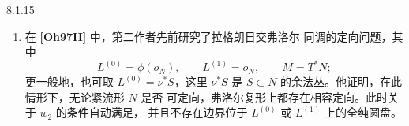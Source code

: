 \begin{remark}{8.1.15}
\begin{enumerate}[label=(\arabic*),leftmargin=2.8em]
容易看出，经
\[
 \mathcal I(p)\longrightarrow
 \mathcal P_p(TL^{(0)},TL^{(1)})
\]
拉回后，该丛在每个连通分支上仍不可定向，因为全实边界条件不依赖于
$\mathcal I_{\lambda_p}$ 中的元素。注意，
$\widetilde{\mathcal I}(p)\to\mathcal I(p)$ 是在
$\mathcal I(p)$ 每个连通分支上均非平凡的唯一双覆盖。因此，指标丛
进一步拉回后应当可定向，这就证明了断言。（也可以直接看出第二个
断言，因为 $\widetilde{\mathcal I}(p)$ 给出全实子丛上一族相容的
spin 结构。）

所以，“选取
$\operatorname{Index}(\bar\partial_{\lambda_{p^\pm},Z_-})$
的定向以及 $(\sigma^\pm,\iota_0^\pm,\iota_1^\pm)$”这一资料，
可以改述为：选取 $\widetilde{\mathcal I}(p)$ 上算子族
$\operatorname{Index}\bar\partial_{\cdot,Z_-}$ 的行列式线丛之定向。
后一解释更为典范，也可用于其他情形，例如博特--莫尔斯情形；
见命题 8.8.1。

\item 在 \textbf{[Oh97II]} 中，第二作者先前研究了拉格朗日交弗洛尔
同调的定向问题，其中
\[
 L^{(0)}=\phi(o_N),\qquad L^{(1)}=o_N,
 \qquad M=T^*N;
\]
更一般地，也可取 $L^{(0)}=\nu^*S$，这里 $\nu^*S$ 是
$S\subset N$ 的余法丛。他证明，在此情形下，无论紧流形 $N$ 是否
可定向，弗洛尔复形上都存在相容定向。此时关于 $w_2$ 的条件自动满足，
并且不存在边界位于 $L^{(0)}$ 或 $L^{(1)}$ 上的全纯圆盘。
\end{enumerate}
\end{remark}
